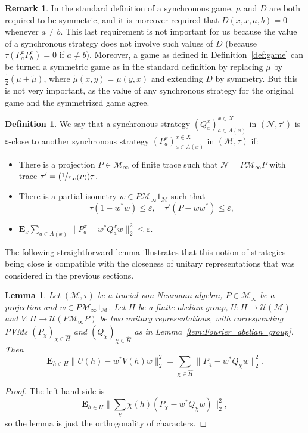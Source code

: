 \documentclass[JEP,XML,SOM,Unicode,published]{cedram}
\newcommand{\Psfrac}[2]{(\sfrac{#1}{#2})}
\theoremstyle{plain}
\newtheorem{lemma}[theorem]{Lemma}
\theoremstyle{definition}
\newtheorem{definition}[theorem]{Definition}
\newtheorem{remark}[theorem]{Remark}
\newcommand{\cM}{\mathcal{M}}
\newcommand{\cN}{\mathcal{N}}
\newcommand{\E}{\mathbf{E}}
\newcommand{\cU}{\mathcal{U}}
\begin{document}
\begin{remark} In the standard definition of a synchronous game, $\mu$ and $D$ are both required to be symmetric, and it is moreover required that $D(x,x,a,b)=0$ whenever $a \neq b$. This last requirement is not important for us because the value of a synchronous strategy does not involve such values of $D$ (because $\tau(P^x_a P^x_b)=0$ if $a\neq b$). Moreover, a game as defined in Definition~\ref{def:game} can be turned a symmetric game as in the standard definition by replacing $\mu$ by $\frac{1}{2}(\mu + \tilde{\mu})$, where $\tilde{\mu}(x,y)=\mu(y,x)$ and extending $D$ by symmetry. But this is not very important, as the value of any synchronous strategy for the original game and the symmetrized game agree.
\end{remark}
\begin{definition} We say that a synchronous strategy $(Q^x_a)_{a \in A(x)}^{x \in X}$ in $(\cN,\tau')$ is $\varepsilon$-close to another synchronous strategy $(P^x_a)_{a \in A(x)}^{x \in X}$ in $(\cM,\tau)$ if:
\begin{itemize}
\item There is a projection $P \in \cM_\infty$ of finite trace such that $\cN = P \cM_\infty P$ with trace $\tau' = \Psfrac{1}{\tau_\infty(P)} \tau$.
\item There is a partial isometry $w \in P \cM_\infty 1_\cM$ such that
\[
\tau(1-w^*w) \leq \varepsilon,\quad \tau'(P-w w^*)\leq \varepsilon,
\]
\item $\E_x \sum_{a \in A(x)} \|P^x_a - w^* Q^x_a w\|_2^2\leq \varepsilon$.
\end{itemize}
\end{definition}
The following straightforward lemma illustrates that this notion of strategies being close is compatible with the closeness of unitary representations that was considered in the previous sections.
\begin{lemma}\label{lem:close_strategies_unitaries} Let $(\cM,\tau)$ be a tracial von Neumann algebra, $P \in \cM_\infty$ be a projection and $w \in P\cM_\infty 1_\cM$. Let $H$ be a finite abelian group, $U:H\to \cU(\cM)$ and $V:H \to\cU(P\cM_\infty P)$ be two unitary representations, with corresponding PVMs $(P_\chi)_{\chi \in \hat H}$ and $(Q_\chi)_{\chi \in \hat H}$ as in Lemma~\ref{lem:Fourier_abelian_group}. Then
\[
\E_{h\in H} \|U(h) - w^* V(h) w\|_2^2 = \sum_{\chi \in \hat H} \|P_\chi - w^* Q_\chi w\|_2^2.
\]
\end{lemma}
\begin{proof}
The left-hand side is
\[
\E_{h\in H} \|\sum_\chi \chi(h) (P_\chi - w^* Q_\chi w)\|_2^2,
\]
so the lemma is just the orthogonality of characters.\end{proof}
\end{document}
